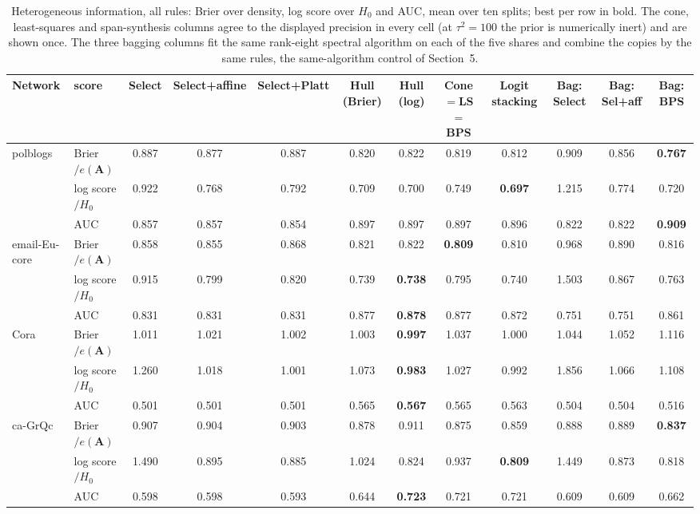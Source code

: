 \documentclass[12pt]{article}
\begin{document}
\begin{table}[ht]
\centering
\caption{Heterogeneous information, all rules: Brier over density, log score over $H_0$ and AUC, mean over ten splits; best per row in bold. The cone, least-squares and span-synthesis columns agree to the displayed precision in every cell (at $\tau^2=100$ the prior is numerically inert) and are shown once. The three bagging columns fit the same rank-eight spectral algorithm on each of the five shares and combine the copies by the same rules, the same-algorithm control of Section~5.}
\label{tab:heterofull}
\begin{tabular}{llcccccccccc}
\toprule
Network & score & Select & Select+affine & Select+Platt & Hull (Brier) & Hull (log) & Cone$=$LS$=$BPS & Logit stacking & Bag: Select & Bag: Sel+aff & Bag: BPS \\
\midrule
polblogs & Brier$/e(\mathbf{A})$ & 0.887 & 0.877 & 0.887 & 0.820 & 0.822 & 0.819 & 0.812 & 0.909 & 0.856 & \textbf{0.767} \\
 & log score$/H_0$ & 0.922 & 0.768 & 0.792 & 0.709 & 0.700 & 0.749 & \textbf{0.697} & 1.215 & 0.774 & 0.720 \\
 & AUC & 0.857 & 0.857 & 0.854 & 0.897 & 0.897 & 0.897 & 0.896 & 0.822 & 0.822 & \textbf{0.909} \\
email-Eu-core & Brier$/e(\mathbf{A})$ & 0.858 & 0.855 & 0.868 & 0.821 & 0.822 & \textbf{0.809} & 0.810 & 0.968 & 0.890 & 0.816 \\
 & log score$/H_0$ & 0.915 & 0.799 & 0.820 & 0.739 & \textbf{0.738} & 0.795 & 0.740 & 1.503 & 0.867 & 0.763 \\
 & AUC & 0.831 & 0.831 & 0.831 & 0.877 & \textbf{0.878} & 0.877 & 0.872 & 0.751 & 0.751 & 0.861 \\
Cora & Brier$/e(\mathbf{A})$ & 1.011 & 1.021 & 1.002 & 1.003 & \textbf{0.997} & 1.037 & 1.000 & 1.044 & 1.052 & 1.116 \\
 & log score$/H_0$ & 1.260 & 1.018 & 1.001 & 1.073 & \textbf{0.983} & 1.027 & 0.992 & 1.856 & 1.066 & 1.108 \\
 & AUC & 0.501 & 0.501 & 0.501 & 0.565 & \textbf{0.567} & 0.565 & 0.563 & 0.504 & 0.504 & 0.516 \\
ca-GrQc & Brier$/e(\mathbf{A})$ & 0.907 & 0.904 & 0.903 & 0.878 & 0.911 & 0.875 & 0.859 & 0.888 & 0.889 & \textbf{0.837} \\
 & log score$/H_0$ & 1.490 & 0.895 & 0.885 & 1.024 & 0.824 & 0.937 & \textbf{0.809} & 1.449 & 0.873 & 0.818 \\
 & AUC & 0.598 & 0.598 & 0.593 & 0.644 & \textbf{0.723} & 0.721 & 0.721 & 0.609 & 0.609 & 0.662 \\

\end{tabular}
\end{table}
\end{document}
